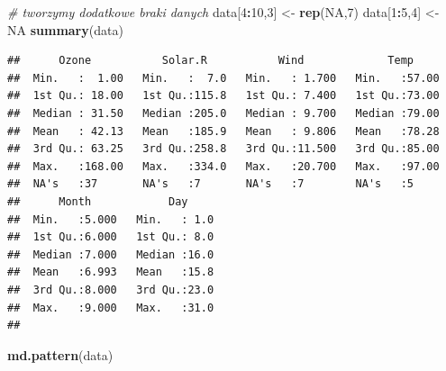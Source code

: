 \documentclass[
]{book}
\newenvironment{Shaded}{\begin{snugshade}}{\end{snugshade}}
\newcommand{\CommentTok}[1]{\textcolor[rgb]{0.56,0.35,0.01}{\textit{#1}}}
\newcommand{\ConstantTok}[1]{\textcolor[rgb]{0.56,0.35,0.01}{#1}}
\newcommand{\DecValTok}[1]{\textcolor[rgb]{0.00,0.00,0.81}{#1}}
\newcommand{\FunctionTok}[1]{\textcolor[rgb]{0.13,0.29,0.53}{\textbf{#1}}}
\newcommand{\NormalTok}[1]{#1}
\newcommand{\OtherTok}[1]{\textcolor[rgb]{0.56,0.35,0.01}{#1}}
\newcommand{\SpecialCharTok}[1]{\textcolor[rgb]{0.81,0.36,0.00}{\textbf{#1}}}
\theoremstyle{plain}
\theoremstyle{definition}
\theoremstyle{definition}
\theoremstyle{definition}
\theoremstyle{definition}
\theoremstyle{definition}
\theoremstyle{remark}
\begin{document}
\begin{Shaded}
\begin{Highlighting}[]
\CommentTok{\# tworzymy dodatkowe braki danych}
\NormalTok{data[}\DecValTok{4}\SpecialCharTok{:}\DecValTok{10}\NormalTok{,}\DecValTok{3}\NormalTok{] }\OtherTok{\textless{}{-}} \FunctionTok{rep}\NormalTok{(}\ConstantTok{NA}\NormalTok{,}\DecValTok{7}\NormalTok{)}
\NormalTok{data[}\DecValTok{1}\SpecialCharTok{:}\DecValTok{5}\NormalTok{,}\DecValTok{4}\NormalTok{] }\OtherTok{\textless{}{-}} \ConstantTok{NA}
\FunctionTok{summary}\NormalTok{(data)}
\end{Highlighting}
\end{Shaded}

\begin{verbatim}
##      Ozone           Solar.R           Wind             Temp      
##  Min.   :  1.00   Min.   :  7.0   Min.   : 1.700   Min.   :57.00  
##  1st Qu.: 18.00   1st Qu.:115.8   1st Qu.: 7.400   1st Qu.:73.00  
##  Median : 31.50   Median :205.0   Median : 9.700   Median :79.00  
##  Mean   : 42.13   Mean   :185.9   Mean   : 9.806   Mean   :78.28  
##  3rd Qu.: 63.25   3rd Qu.:258.8   3rd Qu.:11.500   3rd Qu.:85.00  
##  Max.   :168.00   Max.   :334.0   Max.   :20.700   Max.   :97.00  
##  NA's   :37       NA's   :7       NA's   :7        NA's   :5      
##      Month            Day      
##  Min.   :5.000   Min.   : 1.0  
##  1st Qu.:6.000   1st Qu.: 8.0  
##  Median :7.000   Median :16.0  
##  Mean   :6.993   Mean   :15.8  
##  3rd Qu.:8.000   3rd Qu.:23.0  
##  Max.   :9.000   Max.   :31.0  
## 
\end{verbatim}

\begin{Shaded}
\begin{Highlighting}[]
\FunctionTok{md.pattern}\NormalTok{(data)}
\end{Highlighting}
\end{Shaded}
\end{document}
